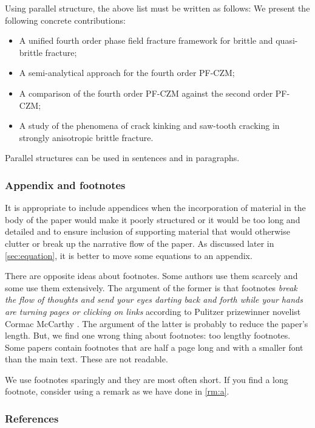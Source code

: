 \documentclass[authoryear,12pta4paper,fleqn]{article}
\numberwithin{equation}{section}
\theoremstyle{remark}
\begin{document}
Using parallel structure, the above list must be written as follows: We present the following concrete contributions:
\begin{itemize}
	\item A unified fourth order phase field fracture framework for brittle and quasi-brittle fracture;
\item A semi-analytical approach for the fourth order PF-CZM;
\item A comparison of the fourth order PF-CZM against the second order PF-CZM;
\item A study of the phenomena of crack kinking and saw-tooth cracking in strongly anisotropic brittle fracture.
\end{itemize}

Parallel structures can be used in sentences and in paragraphs. 

\subsubsection{Appendix and footnotes}\label{sec:appendix-footnotes}

It is appropriate to include appendices when
the incorporation of material in the body of the paper would make it poorly structured or it would be too long and detailed and to ensure inclusion of supporting material that would otherwise clutter or break up the narrative flow of the paper.
As discussed later in \cref{sec:equation}, it is better to move some equations to an appendix.

There are opposite ideas about footnotes. Some authors use them scarcely and some use them extensively. The argument of the former is that footnotes \textit{break the flow of thoughts and send your eyes darting back and forth while your hands are turning pages or clicking on links} according to Pulitzer prizewinner novelist Cormac McCarthy \citep{savage2019novelist}. The argument of the latter is probably to reduce the paper's length. But, we find one wrong thing about footnotes: too lengthy footnotes. Some papers contain footnotes that are half a page long and with a smaller font than the main text. These are not readable.

We use footnotes sparingly and they are most often short. If you find a long footnote, consider using a remark as we have done in \cref{rm:a}.

\subsubsection{References}\label{sec:references}
\end{document}
